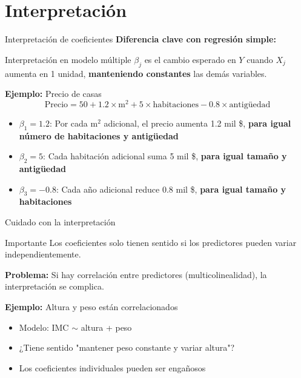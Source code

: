 \documentclass[aspectratio=169]{beamer}
\begin{document}
\section{Interpretación}

\begin{frame}{Interpretación de coeficientes}
\textbf{Diferencia clave con regresión simple:}

\begin{block}{Interpretación en modelo múltiple}
$\beta_j$ es el cambio esperado en $Y$ cuando $X_j$ aumenta en 1 unidad, \textbf{manteniendo constantes} las demás variables.
\end{block}

\vspace{0.5cm}
\textbf{Ejemplo:} Precio de casas
\[
\text{Precio} = 50 + 1.2 \times \text{m}^2 + 5 \times \text{habitaciones} - 0.8 \times \text{antigüedad}
\]

\begin{itemize}
    \item $\beta_1 = 1.2$: Por cada m$^2$ adicional, el precio aumenta 1.2 mil \$, \textbf{para igual número de habitaciones y antigüedad}
    \item $\beta_2 = 5$: Cada habitación adicional suma 5 mil \$, \textbf{para igual tamaño y antigüedad}
    \item $\beta_3 = -0.8$: Cada año adicional reduce 0.8 mil \$, \textbf{para igual tamaño y habitaciones}
\end{itemize}
\end{frame}

\begin{frame}{Cuidado con la interpretación}
\begin{alertblock}{Importante}
Los coeficientes solo tienen sentido si los predictores pueden variar independientemente.
\end{alertblock}

\vspace{0.5cm}
\textbf{Problema:} Si hay correlación entre predictores (multicolinealidad), la interpretación se complica.

\vspace{0.3cm}
\textbf{Ejemplo:} Altura y peso están correlacionados
\begin{itemize}
    \item Modelo: IMC $\sim$ altura + peso
    \item ¿Tiene sentido "mantener peso constante y variar altura"?
    \item Los coeficientes individuales pueden ser engañosos
\end{itemize}
\end{frame}
\end{document}
